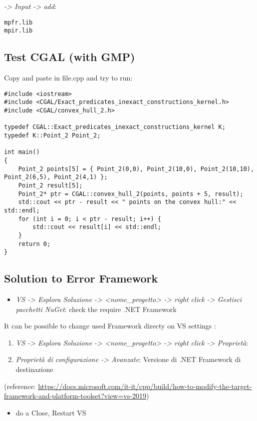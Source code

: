\documentclass[10pt, english, openany]{report}
\begin{document}
\begin{appendices}
\begin{enumerate}
	 \textit{-> Input -> add}:
\begin{lstlisting}
mpfr.lib
mpir.lib	
\end{lstlisting}
\end{enumerate}
	
\subsection{Test CGAL (with GMP)}
Copy and paste in file.cpp and try to run:

\begin{lstlisting}
#include <iostream>
#include <CGAL/Exact_predicates_inexact_constructions_kernel.h>
#include <CGAL/convex_hull_2.h>

typedef CGAL::Exact_predicates_inexact_constructions_kernel K;
typedef K::Point_2 Point_2;
    
int main()
{
	Point_2 points[5] = { Point_2(0,0), Point_2(10,0), Point_2(10,10), Point_2(6,5), Point_2(4,1) };
	Point_2 result[5];
	Point_2* ptr = CGAL::convex_hull_2(points, points + 5, result);
	std::cout << ptr - result << " points on the convex hull:" << std::endl;
	for (int i = 0; i < ptr - result; i++) {
		std::cout << result[i] << std::endl;
	}
	return 0;
}
\end{lstlisting}

\subsection{Solution to Error Framework}
\begin{itemize}
\item \textit{VS -> Esplora Soluzione -> <nome\_progetto> -> right click -> Gestisci pacchetti NuGet}: check the require .NET Framework
\end{itemize}
It can be possible to change used Framework directy on VS settings :
\begin{enumerate}
\item \textit{VS -> Esplora Soluzione -> <nome\_progetto> -> right click -> Proprietà}:
\item \textit{Proprietà di configurazione -> Avanzate}: Versione di .NET Framework di destinazione
\end{enumerate}
(reference: \href{https://docs.microsoft.com/it-it/cpp/build/how-to-modify-the-target-framework-and-platform-toolset?view=vs-2019}{https://docs.microsoft.com/it-it/cpp/build/how-to-modify-the-target-framework-and-platform-toolset?view=vs-2019})
\begin{itemize}
\item do a Close, Restart VS
\end{itemize}


\end{appendices}
\end{document}
